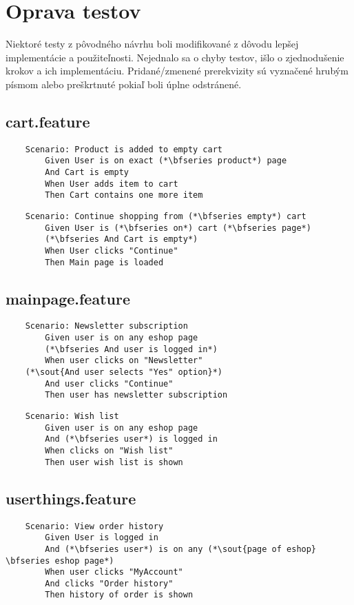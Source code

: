 \documentclass[titlepage]{article}
\begin{document}
   \section{Oprava testov}
	Niektoré testy z pôvodného návrhu boli modifikované z dôvodu lepšej implementácie a použiteľnosti. Nejednalo sa o chyby testov, išlo o zjednodušenie krokov a ich implementáciu. Pridané/zmenené prerekvizity sú vyznačené hrubým písmom alebo preškrtnuté pokiaľ boli úplne odstránené.
	\subsection{cart.feature}
	\begin{lstlisting}
	Scenario: Product is added to empty cart
        Given User is on exact (*\bfseries product*) page
        And Cart is empty
        When User adds item to cart
        Then Cart contains one more item
	\end{lstlisting}

	\begin{lstlisting}
	Scenario: Continue shopping from (*\bfseries empty*) cart
        Given User is (*\bfseries on*) cart (*\bfseries page*)
        (*\bfseries And Cart is empty*)
        When User clicks "Continue"
        Then Main page is loaded			
	\end{lstlisting}
	\subsection{mainpage.feature}
	\begin{lstlisting}
	Scenario: Newsletter subscription
        Given user is on any eshop page
        (*\bfseries And user is logged in*)
        When user clicks on "Newsletter"
	(*\sout{And user selects "Yes" option}*)
        And user clicks "Continue"
        Then user has newsletter subscription
	\end{lstlisting}
	\begin{lstlisting}
	Scenario: Wish list
        Given user is on any eshop page
        And (*\bfseries user*) is logged in
        When clicks on "Wish list"
        Then user wish list is shown
	\end{lstlisting}
	\subsection{userthings.feature}
	\begin{lstlisting}
	Scenario: View order history
        Given User is logged in 
        And (*\bfseries user*) is on any (*\sout{page of eshop} \bfseries eshop page*)
        When user clicks "MyAccount"
        And clicks "Order history"
        Then history of order is shown
	\end{lstlisting}
	
\end{document}
